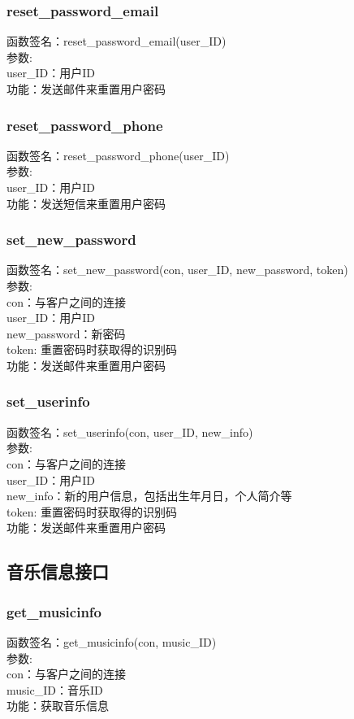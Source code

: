 \subsubsection{reset\_password\_email}
\noindent
函数签名：reset\_password\_email(user\_ID)\\
参数:\\
user\_ID：用户ID\\
功能：发送邮件来重置用户密码

\subsubsection{reset\_password\_phone}
\noindent
函数签名：reset\_password\_phone(user\_ID)\\
参数:\\
user\_ID：用户ID\\
功能：发送短信来重置用户密码

\subsubsection{set\_new\_password}
\noindent
函数签名：set\_new\_password(con, user\_ID, new\_password, token)\\
参数:\\
con：与客户之间的连接\\
user\_ID：用户ID\\
new\_password：新密码\\
token: 重置密码时获取得的识别码\\
功能：发送邮件来重置用户密码

\subsubsection{set\_userinfo}
\noindent
函数签名：set\_userinfo(con, user\_ID, new\_info)\\
参数:\\
con：与客户之间的连接\\
user\_ID：用户ID\\
new\_info：新的用户信息，包括出生年月日，个人简介等\\
token: 重置密码时获取得的识别码\\
功能：发送邮件来重置用户密码


\subsection{音乐信息接口}

\subsubsection{get\_musicinfo}
\noindent
函数签名：get\_musicinfo(con, music\_ID)\\
参数:\\
con：与客户之间的连接\\
music\_ID：音乐ID\\
功能：获取音乐信息

